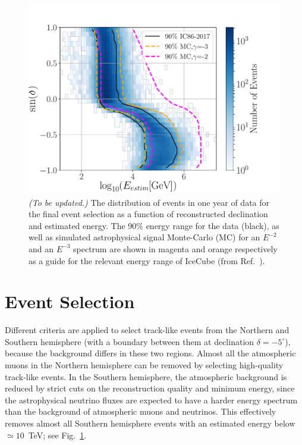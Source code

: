 \documentclass[aps,10pt,prd,twocolumn,floats,letterpaper,showpacs,nofootinbib,bibnotes,notitlepage,superscriptaddress,floatfix]{revtex4-1}
\newcommand{\MA}[1]{{\color{magenta}#1}}
\begin{document}
\begin{figure}[t]
\centering
\includegraphics[width=\linewidth]{IC86II_enDist.pdf}
\caption[]{\MA{\it (To be updated.)} The distribution of events in one year of data for the final event selection as a function of reconstructed declination and estimated energy. The 90\% energy range for the data (black), as well as simulated astrophysical signal Monte-Carlo (MC) for an $E^{-2}$ and an $E^{-3}$ spectrum are shown in magenta and orange respectively as a guide for the relevant energy range of IceCube (from Ref.~\cite{Aartsen:2019fau}).}\label{fig:enDist}
\end{figure}

\section{Event Selection}

Different criteria are applied to select track-like events from the Northern and Southern hemisphere (with a boundary between them at declination $\delta=-5^\circ$), because the background differs in these two regions. Almost all the atmospheric muons in the Northern hemisphere can be removed by selecting high-quality track-like events. In the Southern hemisphere, the atmospheric background is reduced by strict cuts on the reconstruction quality and minimum energy, since the astrophysical neutrino fluxes are expected to have a harder energy spectrum than the background of atmospheric muons and neutrinos. This effectively removes almost all Southern hemisphere events with an estimated energy below $\simeq10$~TeV; see Fig.~\ref{fig:enDist}. 
\end{document}
